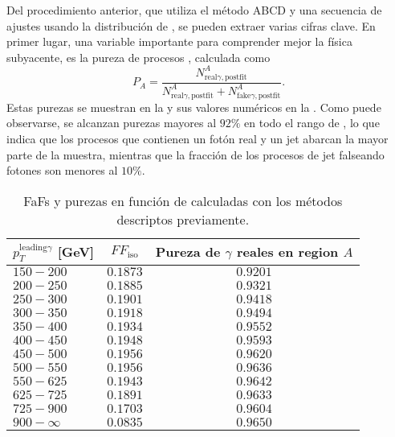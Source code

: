 Del procedimiento anterior, que utiliza el método ABCD y una secuencia de ajustes usando la distribución de \etiso, se pueden extraer varias cifras clave. En primer lugar, una variable importante para comprender mejor la física subyacente, es la pureza de procesos \gammajet, calculada como
\[
    P_A = \frac{
        N^{A}_{\text{real}\gamma, \text{postfit}}
    }{
        N^{A}_{\text{real}\gamma, \text{postfit}} + N^{A}_{\text{fake}\gamma, \text{postfit}}
    }.
\]
Estas purezas se muestran en la \Fig{\ref{fig:bkg:estimation:results:results:purities}} y sus valores numéricos en la \Tab{\ref{tab:bkg:estimation:results:ffiso_purity_values}}. Como puede observarse, se alcanzan purezas mayores al \(92\%\) en todo el rango de \ptgam, lo que indica que los procesos que contienen un fotón real y un jet abarcan la mayor parte de la muestra, mientras que la fracción de los procesos de jet falseando fotones son menores al \(10\%\).

\begin{table}[ht!]
    \caption{\acp{FaF} y purezas en función de \ptgam calculadas con los métodos descriptos previamente.}
    \begin{tabular}{lcc}
        \toprule
        \(p_{T}^{\text{leading} \gamma}\) [GeV] & \(FF_{\text{iso}}\) &  Pureza de \(\gamma\) reales en region \(A\) \\
        \midrule
        $150-200$    & $0.1873$ & $0.9201$ \\
        $200-250$    & $0.1885$ & $0.9321$ \\
        $250-300$    & $0.1901$ & $0.9418$ \\
        $300-350$    & $0.1918$ & $0.9494$ \\
        $350-400$    & $0.1934$ & $0.9552$ \\
        $400-450$    & $0.1948$ & $0.9593$ \\
        $450-500$    & $0.1956$ & $0.9620$ \\
        $500-550$    & $0.1956$ & $0.9636$ \\
        $550-625$    & $0.1943$ & $0.9642$ \\
        $625-725$    & $0.1891$ & $0.9633$ \\
        $725-900$    & $0.1703$ & $0.9604$ \\
        $900-\infty$ & $0.0835$ & $0.9650$ \\
        \bottomrule
    \end{tabular}
    \label{tab:bkg:estimation:results:ffiso_purity_values}
    \centering
\end{table}




